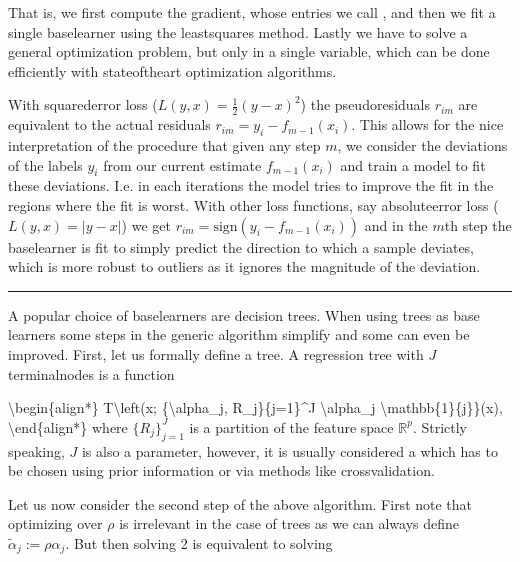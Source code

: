 \documentclass[letterpaper,10pt,english]{sphinxmanual}
\begin{document}
That is, we first compute the gradient, whose entries we call , and then we fit a single base\sphinxhyphen{}learner using the least\sphinxhyphen{}squares method. Lastly we have to solve a general optimization problem, but only in a single variable, which can be done efficiently with state\sphinxhyphen{}of\sphinxhyphen{}the\sphinxhyphen{}art optimization algorithms.

With squared\sphinxhyphen{}error loss (\(L(y, x) = \frac{1}{2}(y - x)^2\)) the pseudo\sphinxhyphen{}residuals \(r_{im}\) are equivalent to the actual residuals \(r_{im} = y_i - f_{m-1}(x_i)\). This allows for the nice interpretation of the procedure that given any step \(m\), we consider the deviations of the labels \(y_i\) from our current estimate \(f_{m-1}(x_i)\) and train a model to fit these deviations. I.e. in each iterations the model tries to improve the fit in the regions where the fit is worst. With other loss functions, say absolute\sphinxhyphen{}error loss (\(L(y, x) = |y - x|\)) we get \(r_{im} = \text{sign}(y_i - f_{m-1}(x_i))\) and in the \(m\)\sphinxhyphen{}th step the base\sphinxhyphen{}learner is fit to simply predict the direction to which a sample deviates, which is more robust to outliers as it ignores the magnitude of the deviation.


\bigskip\hrule\bigskip



A popular choice of base\sphinxhyphen{}learners are decision trees. When using trees as base learners some steps in the generic algorithm simplify and some can even be improved. First, let us formally define a tree. A regression tree with \(J\) terminal\sphinxhyphen{}nodes is a function

\textbackslash{}begin\{align*\}
T\textbackslash{}left(x; \{\textbackslash{}alpha\_j, R\_j\}\{j=1\}\textasciicircum{}J \textbackslash{}alpha\_j \textbackslash{}mathbb\{1\}\{j\}\}(x),
\textbackslash{}end\{align*\}
where \(\{R_j\}_{j=1}^J\) is a partition of the feature space \(\mathbb{R}^p\). Strictly speaking, \(J\) is also a parameter, however, it is usually considered a  which has to be chosen using prior information or via methods like cross\sphinxhyphen{}validation.

Let us now consider the second step of the above algorithm. First note that optimizing over \(\rho\) is irrelevant in the case of trees as we can always define \(\tilde{\alpha}_j := \rho \alpha_j\). But then solving 2 is equivalent to solving
\end{document}
